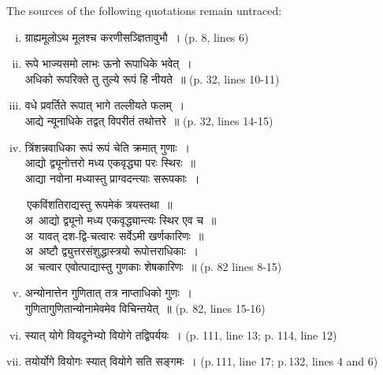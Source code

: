 \documentclass[10pt, openany]{book}
\begin{document}
 {The sources of the following quotations remain untraced:} 

\begin{enumerate}[(i)]
    \item {\qt ग्राह्यमूलोऽथ मूलश्च करणीसञ्ज्ञितावुभौ~। } \englishfont \hfill (p. 8, lines 6) 

    \item {\qt रूपे भाज्यसमो लाभः ऊनो रूपाधिके भवेत्~। \\
 अधिको रूपरिक्ते तु तुल्ये रूपं हि नीयते~॥} \englishfont \hfill (p. 32, lines 10-11) 
 \end{enumerate}

\newpage

\begin{enumerate}[(i)]
  \setcounter{enumi}{2}
 \item {\qt वधे प्रवर्तिते रूपात् भागे तल्लीयते फलम्~। \\
 आद्ये न्यूनाधिके तद्वत् विपरीतं तथोत्तरे~॥} \englishfont \hfill (p. 32, lines 14-15) 

 \item {\qt त्रिंशन्नवाधिका रूपं रूपं चेति क्रमात् गुणाः~। \\
 आद्यो द्व्यूनोत्तरो मध्य एकवृद्ध्या परः स्थिरः~॥ \\
 आद्या नवोना मध्यास्तु प्राग्वदन्त्याः सरूपकाः~।}
 \vspace{1mm}

\hspace{-4mm} \textendash \,{\qt एकविंशतिराद्यस्तु रूपमेकं त्रयस्तथा~॥} \\
{\color{white}अ\,} {\qt आद्यो द्व्यूनो मध्य एकवृद्ध्यान्त्यः स्थिर एव च~॥} \\
{\color{white}अ\,} {\qt यावत् दश-द्वि-चत्वारः सर्वेऽमी खर्णकारिणः~॥} \\
{\color{white}अ\,} {\qt अष्टौ द्व्युत्तरसंशुद्धास्त्रयो रूपोत्तराधिकाः~।} \\
{\color{white}अ\,} {\qt चत्वार एवोत्पाद्यास्तु गुणकाः शेषकारिणः~॥} \englishfont \hfill (p. 82 lines 8-15) 

 \item {\qt अन्योनात्तेन गुणितात् तत्र नाप्ताधिको गुणः~। \\
 गुणितागुणितान्योनामेवमेव विचिन्तयेत्~॥ } \englishfont \hfill (p. 82, lines 15-16) 

 \item {\qt स्यात् योगे वियदूनेभ्यो वियोगे तद्विपर्ययः~। } \englishfont \hfill (p. 111, line 13; p. 114, line 12) 

 \item {\qt तयोर्योगे वियोगः स्यात् वियोगे सति सङ्गमः~।} \englishfont \hfill (p.\,111, line 17; p.\,132, lines 4 and 6) 


\end{enumerate}
\end{document}
